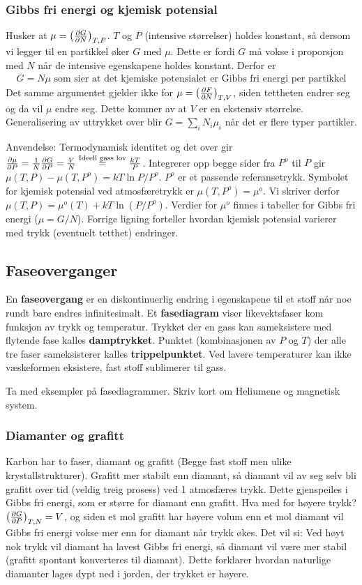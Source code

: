 \documentclass[12pt]{article}
\begin{document}
\subsubsection{Gibbs fri energi og kjemisk potensial}
Husker at $\mu = \left(\pdv{G}{N}\right)_{T,P}$. $T$ og $P$ (intensive størrelser) holdes
konstant, så dersom vi legger til en partikkel øker $G$ med $\mu$. Dette er fordi $G$ må
vokse i proporsjon med $N$ når de intensive egenskapene holdes konstant. Derfor er
\begin{align*}
  G = N \mu \text{ som sier at det kjemiske potensialet er Gibbs fri energi per partikkel}
\end{align*}
Det samme argumentet gjelder ikke for $\mu = \left(\pdv{F}{N}\right)_{T,V}$, siden
tettheten endrer seg og da vil $\mu$ endre seg. Dette kommer av at $V$ er en ekstensiv størrelse.
Generalisering av uttrykket over blir $G = \sum_i N_i \mu_i$ når det er flere typer partikler.

Anvendelse: Termodynamisk identitet og det over gir $\pdv{\mu}{P} = \frac{1}{N} \pdv{G}{P} = \frac{V}{N} \overset{\text{Ideell gass lov}}{=} \frac{kT}{P}$.
Integrerer opp begge sider fra $P^o$ til $P$ gir $\mu(T,P) - \mu(T, P^o) = kT\ln{P/P^o}$. $P^o$ er et passende referansetrykk. Symbolet for
kjemisk potensial ved atmosfæretrykk er $\mu(T,P^o) = \mu^o$. Vi skriver derfor $\mu(T,P) = \mu^o(T) + kT \ln{(P/P^o)}$.
Verdier for $\mu^o$ finnes i tabeller for Gibbs fri energi ($\mu = G/N$). Forrige ligning forteller
hvordan kjemisk potensial varierer med trykk (eventuelt tetthet) endringer.
\subsection{Faseoverganger}
En \textbf{faseovergang} er en diskontinuerlig endring i egenskapene til et stoff
når noe rundt bare endres infinitesimalt. Et \textbf{fasediagram} viser likevektsfaser
kom funksjon av trykk og temperatur. Trykket der en gass kan sameksistere med flytende
fase kalles \textbf{damptrykket}. Punktet (kombinasjonen av $P$ og $T$) der
alle tre faser sameksisterer kalles \textbf{trippelpunktet}. Ved lavere temperaturer
kan ikke væskeformen eksistere, fast stoff sublimerer til gass.

Ta med eksempler på fasediagrammer. Skriv kort om Heliumene og magnetisk system.
\subsubsection{Diamanter og grafitt}
Karbon har to faser, diamant og grafitt (Begge fast stoff men ulike krystallstrukturer). Grafitt
mer stabilt enn diamant, så diamant vil av seg selv bli grafitt over tid (veldig treig prosess) ved 1 atmosfæres trykk.
Dette gjenspeiles i Gibbs fri energi, som er større for diamant enn grafitt. Hva med for
høyere trykk? $\left( \pdv{G}{P} \right)_{T,N} = V$, og siden et mol grafitt har høyere
volum enn et mol diamant vil Gibbs fri energi vokse mer enn for diamant når trykk økes.
Det vil si: Ved høyt nok trykk vil diamant ha lavest Gibbs fri energi, så
diamant vil være mer stabil (grafitt spontant konverteres til diamant). Dette
forklarer hvordan naturlige diamanter lages dypt ned i jorden, der trykket er høyere.
\end{document}
